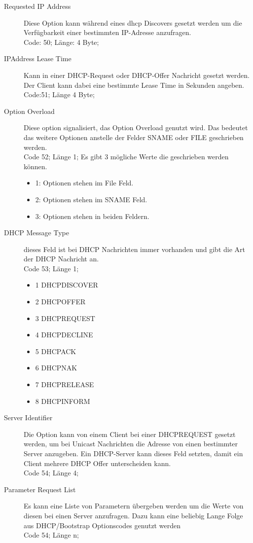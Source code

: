 \begin{description}
	\item[Requested IP Address] Diese Option kann während eines dhcp Discovers gesetzt werden um die Verfügbarkeit einer bestimmten IP-Adresse anzufragen.\\
	Code: 50; Länge: 4 Byte;
	 
	\item[IPAddress Lease Time] Kann in einer DHCP-Request oder DHCP-Offer Nachricht gesetzt werden. Der Client kann dabei eine bestimmte Lease Time in Sekunden angeben.\\
	Code:51; Länge 4 Byte;
	
	\item[Option Overload] Diese option signalisiert, das Option Overload genutzt wird. Das bedeutet das weitere Optionen anstelle der Felder SNAME oder FILE geschrieben werden. \\
	Code 52; Länge 1;
	Es gibt 3 mögliche Werte die geschrieben werden können. 
	\begin{itemize}
		\item 1: Optionen stehen im File Feld. 
		\item 2: Optionen stehen im SNAME Feld.
		\item 3: Optionen stehen in beiden Feldern.
	\end{itemize}
	
	\item[DHCP Message Type] dieses Feld ist bei DHCP Nachrichten immer vorhanden und gibt die Art der DHCP Nachricht an. \\
	Code 53; Länge 1;
	\begin{itemize}
		\item 1 DHCPDISCOVER
		\item 2 DHCPOFFER
		\item 3 DHCPREQUEST
		\item 4 DHCPDECLINE
		\item 5 DHCPACK
		\item 6 DHCPNAK
		\item 7 DHCPRELEASE
		\item 8 DHCPINFORM		
		
	\end{itemize}
	
	\item[Server Identifier] Die Option kann von einem Client bei einer DHCPREQUEST gesetzt werden, um bei Unicast Nachrichten die Adresse von einen bestimmter Server anzugeben. Ein DHCP-Server kann dieses Feld setzten, damit ein Client mehrere DHCP Offer unterscheiden kann. \\
	Code 54; Länge 4;
	
	
	\item[Parameter Request List] Es kann eine Liste von Parametern übergeben werden um die Werte von diesen bei einen Server anzufragen. Dazu kann eine beliebig Lange Folge aus DHCP/Bootstrap Optionscodes genutzt werden\\
	Code 54; Länge n;
	
	
\end{description}

